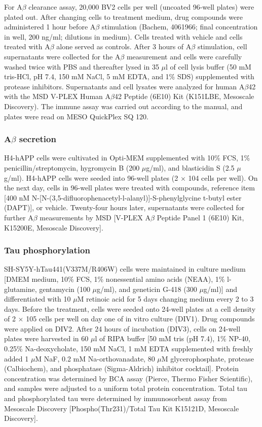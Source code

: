 \documentclass[letterpaper]{article}
\begin{document}
For A$\beta$ clearance assay, 20,000 BV2 cells per well (uncoated 96-well
plates) were plated out. After changing cells to treatment medium, drug
compounds were administered 1 hour before A$\beta$ stimulation (Bachem,
4061966; final concentration in well, 200 ng/ml; dilutions in medium). Cells
treated with vehicle and cells treated with A$\beta$ alone served as controls.
After 3 hours of A$\beta$ stimulation, cell supernatants were collected for
the A$\beta$ measurement and cells were carefully washed twice with PBS and
thereafter lysed in 35 $\mu$l of cell lysis buffer (50 mM tris-HCl, pH 7.4,
150 mM NaCl, 5 mM EDTA, and 1\% SDS) supplemented with protease inhibitors.
Supernatants and cell lysates were analyzed for human A$\beta$42 with the MSD
V-PLEX Human A$\beta$42 Peptide (6E10) Kit (K151LBE, Mesoscale Discovery). The
immune assay was carried out according to the manual, and plates were read on
MESO QuickPlex SQ 120.

\subsubsection{A$\beta$ secretion}

H4-hAPP cells were cultivated in Opti-MEM supplemented with 10\% FCS, 1\%
penicillin/streptomycin, hygromycin B (200 $\mu$g/ml), and blasticidin S (2.5
$\mu$g/ml).  H4-hAPP cells were seeded into 96-well plates (2 $\times$ 104
cells per well). On the next day, cells in 96-well plates were treated with
compounds, reference item [400 nM
N-[N-(3,5-difluorophenacetyl-l-alanyl)]-S-phenylglycine t-butyl ester (DAPT)],
or vehicle. Twenty-four hours later, supernatants were collected for further
A$\beta$ measurements by MSD [V-PLEX A$\beta$ Peptide Panel 1 (6E10) Kit,
K15200E, Mesoscale Discovery].

\subsubsection{Tau phosphorylation}

SH-SY5Y-hTau441(V337M/R406W) cells were maintained in culture medium [DMEM
medium, 10\% FCS, 1\% nonessential amino acids (NEAA), 1\% l-glutamine,
gentamycin (100 $\mu$g/ml), and geneticin G-418 (300 $\mu$g/ml)] and
differentiated with 10 $\mu$M retinoic acid for 5 days changing medium every 2
to 3 days. Before the treatment, cells were seeded onto 24-well plates at a
cell density of 2 $\times$ 105 cells per well on day one of in vitro culture
(DIV1). Drug compounds were applied on DIV2. After 24 hours of incubation
(DIV3), cells on 24-well plates were harvested in 60 $\mu$l of RIPA buffer [50
mM tris (pH 7.4), 1\% NP-40, 0.25\% Na-deoxycholate, 150 mM NaCl, 1 mM EDTA
supplemented with freshly added 1 $\mu$M NaF, 0.2 mM Na-orthovanadate, 80
$\mu$M glycerophosphate, protease (Calbiochem), and phosphatase
(Sigma-Aldrich) inhibitor cocktail]. Protein concentration was determined by
BCA assay (Pierce, Thermo Fisher Scientific), and samples were adjusted to a
uniform total protein concentration. Total tau and phosphorylated tau were
determined by immunosorbent assay from Mesoscale Discovery
[Phospho(Thr231)/Total Tau Kit K15121D, Mesoscale Discovery].
\end{document}
